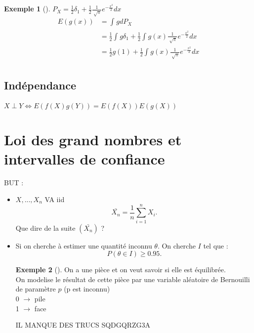 \documentclass{article}
\theoremstyle{plain}%
\theoremstyle{definition}
\newtheorem{exmp}{Exemple}[section]
\theoremstyle{remark}
\begin{document}
\begin{exmp}[]
    $ P_X = \frac{1}{2}\delta _1 + \frac{1}{2} \frac{1}{\sqrt[]{\pi }} e^{-\frac{x^2}{2}} dx $ \begin{align*}
        E(g(x)) &= \int_{}^{}gdP_X \\
                &= \frac{1}{2} \int_{}^{}g \delta _1 + \frac{1}{2} \int_{}^{}g(x) \frac{1}{\sqrt[]{\pi }} e^{-\frac{x^2}{2}} dx \\
                &= \frac{1}{2} g(1) + \frac{1}{2} \int_{}^{}g(x) \frac{1}{\sqrt[]{\pi }} e^{-\frac{x^2}{2}} dx \\
    \end{align*}
\end{exmp}

\subsection{Indépendance}
$ X \perp Y \Leftrightarrow E(f(X)g(Y)) = E(f(X)) E(g(X))$


\section{Loi des grand nombres et intervalles de confiance }
BUT : \begin{itemize}
    \item $ X, ..., X _{n} $ VA iid 
    \[
        \bar{X_n} = \frac{1}{n} \sum_{i=1}^{n}X_i 
    .\]
    Que dire de la suite $ (\bar{X_n}) $ ? 

    \item Si on cherche à estimer une quantité inconnu $ \theta  $. On cherche $ I $ tel que : 
    \[
        P(\theta \in I) \geq 0.95
    .\]
    
    \begin{exmp}[]
        On a une pièce et on veut savoir si elle est équilibrée. \\ 
        On modelise le résultat de cette pièce par une variable aléatoire de Bernouilli de paramètre $ p $ (p est inconnu) \\
        0 $\rightarrow$ pile \\
        1 $\rightarrow$ face \\

    \end{exmp}
    IL MANQUE DES TRUCS SQDGQRZG3A
\end{itemize}
\end{document}
